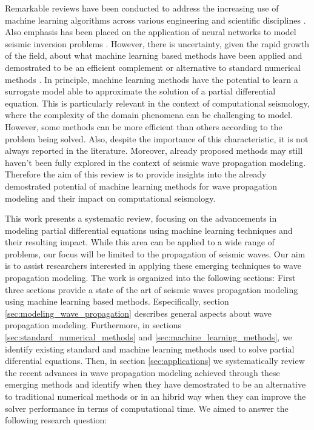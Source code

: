 \documentclass[11pt,twoside]{article}
\begin{document}
Remarkable reviews have been conducted to address the increasing use of machine learning algorithms across various 
engineering and scientific disciplines \citep{vadyala_review_2022,deng_physics-informed_2023,lino_current_2023}. 
Also emphasis has been placed on the application of neural networks to model seismic inversion problems 
\citep{jingbo_research_2023}. However, there is uncertainty, given the rapid growth of the field, about what 
machine learning based methods have been applied and demostrated to be an efficient complement or alternative 
to standard numerical methods \citep{grossmann_can_2023,mcgreivy_weak_2024}. In principle, machine learning 
methods have the potential to learn a surrogate model able to approximate the solution of a partial differential 
equation. This is particularly relevant in the context of computational seismology, where the complexity 
of the domain phenomena can be challenging to model. However, some methods can be more efficient than others 
according to the problem being solved. Also, despite the importance of this characteristic, it is not always 
reported in the literature. Moreover, already proposed methods may still haven't been fully explored
in the context of seismic wave propagation modeling. Therefore the aim of this review is to provide insights 
into the already demostrated potential of machine learning methods for wave propagation modeling and their 
impact on computational seismology.

This work presents a systematic review, focusing on the advancements in modeling 
partial differential equations using machine learning techniques and their resulting impact. While this area 
can be applied to a wide range of problems, our focus will be limited to the propagation of seismic waves. 
Our aim is to assist researchers interested in applying these emerging techniques to wave propagation modeling.
The work is organized into the following sections: First three sections provide a state of the art of seismic 
waves propagation modeling using machine learning based methods. Especifically, section 
\ref{sec:modeling_wave_propagation} describes general aspects about wave propagation modeling. 
Furthermore, in sections \ref{sec:standard_numerical_methods} and \ref{sec:machine_learning_methods}, 
we identify existing standard and machine learning methods used to solve partial diferential equations. 
Then, in section \ref{sec:applications} we systematically review the recent advances in wave propagation 
modeling achieved through these emerging methods and identify when they have demostrated to be an alternative 
to traditional numerical methods or in an hibrid way when they can improve the solver performance in terms 
of computational time. We aimed to answer the following research question:
\end{document}
